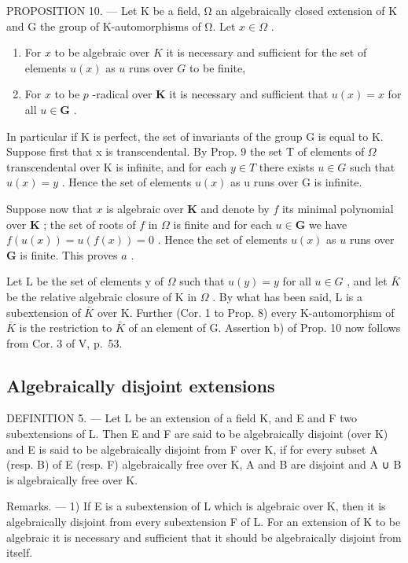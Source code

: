 PROPOSITION 10. --- Let K be a field, Ω an algebraically closed extension of K and G the group of K-automorphisms of Ω. Let \(x \in \Omega\) .

\begin{enumerate}
\def\labelenumi{\alph{enumi})}
\item
  For \(x\) to be algebraic over \(K\) it is necessary and sufficient for the set of elements \(u(x)\) as \(u\) runs over \(G\) to be finite,
\item
  For \(x\) to be \(p\) -radical over \(\mathbf{K}\) it is necessary and sufficient that \(u(x) = x\) for all \(u \in \mathbf{G}\) .
\end{enumerate}

In particular if K is perfect, the set of invariants of the group G is equal to K. Suppose first that x is transcendental. By Prop. 9 the set T of elements of \(\Omega\) transcendental over K is infinite, and for each \(y \in T\) there exists \(u \in G\) such that \(u(x) = y\) . Hence the set of elements \(u(x)\) as u runs over G is infinite.

Suppose now that \(x\) is algebraic over \(\mathbf{K}\) and denote by \(f\) its minimal polynomial over \(\mathbf{K}\) ; the set of roots of \(f\) in \(\Omega\) is finite and for each \(u \in \mathbf{G}\) we have \(f(u(x)) = u(f(x)) = 0\) . Hence the set of elements \(u(x)\) as \(u\) runs over \(\mathbf{G}\) is finite. This proves \(a\) .

Let L be the set of elements y of \(\Omega\) such that \(u(y)=y\) for all \(u\in G\) , and let \(\bar{K}\) be the relative algebraic closure of K in \(\Omega\) . By what has been said, L is a subextension of \(\bar{K}\) over K. Further (Cor. 1 to Prop. 8) every K-automorphism of \(\bar{K}\) is the restriction to \(\bar{K}\) of an element of G. Assertion b) of Prop. 10 now follows from Cor. 3 of V, p.~53.

\subsection{Algebraically disjoint extensions}

DEFINITION 5. --- Let L be an extension of a field K, and E and F two subextensions of L. Then E and F are said to be algebraically disjoint (over K) and E is said to be algebraically disjoint from F over K, if for every subset A (resp. B) of E (resp. F) algebraically free over K, A and B are disjoint and A ∪ B is algebraically free over K.

Remarks. --- 1) If E is a subextension of L which is algebraic over K, then it is algebraically disjoint from every subextension F of L. For an extension of K to be algebraic it is necessary and sufficient that it should be algebraically disjoint from itself.

